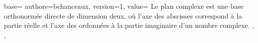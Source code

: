 {
  base={
    authors={bchanceaux},
    version={1},
    value={%
      Le plan complexe est une base orthonormée directe de dimension deux, où l'axe des abscisses correspond à la
partie réelle et l'axe des ordonnées à la partie imaginaire d'un nombre complexe.%
    },
  },
}
